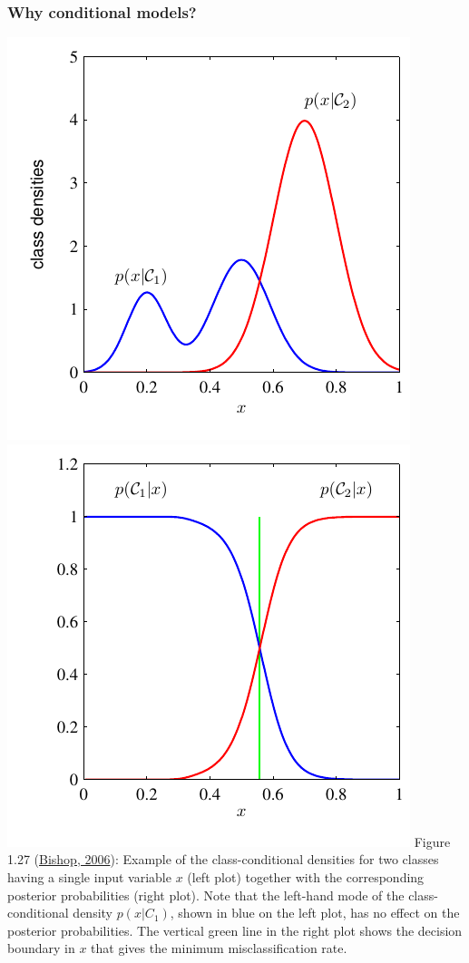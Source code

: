 \documentclass[ignorenonframetext,plain]{beamer}
\begin{document}
\begin{frame}\frametitle{Why conditional models?}
\includegraphics[width=.5\textwidth]{images/Figure1-27a.pdf}
\includegraphics[width=.5\textwidth]{images/Figure1-27b.pdf}
\scriptsize Figure 1.27
(\href{http://research.microsoft.com/en-us/um/people/cmbishop/prml}
{Bishop, 2006}): Example of the class-conditional densities for two
classes having a single input variable $x$ (left plot) together with
the corresponding posterior probabilities (right plot). Note that the
left-hand mode of the class-conditional density $p(x|C_1)$, shown in
blue on the left plot, has no effect on the posterior
probabilities. The vertical green line in the right plot shows the
decision boundary in $x$ that gives the minimum misclassiﬁcation rate.
\end{frame}
\end{document}
